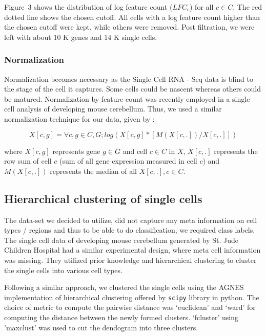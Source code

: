 Figure~3 shows the distribution of log feature count ($LFC_c$) for all $c \in C$. The red dotted line shows the chosen cutoff. All cells with a log feature count higher than the chosen cutoff were kept, while others were removed. Post filtration, we were left with about 10 K genes and 14 K single cells.

\subsubsection*{Normalization}

Normalization becomes necessary as the Single Cell RNA - Seq data is blind to the stage of the cell it captures. Some cells could be nascent whereas others could be matured. Normalization by feature count was recently employed in a single cell analysis \citep{carter2018single} of developing mouse cerebellum. Thus, we used a similar normalization technique for our data, given by :

\begin{equation}
X[c, g] = \forall c, g \in C, G; log ( X [c, g] * \left[ M (X [ c, . ] ) /  X [c, .] \right] )
\end{equation}

where $X [c, g] $ represents gene $g \in G$ and cell $c \in C$ in $X$, $X [c, .]$ represents the row sum of cell $c$ (sum of all gene expression measured in cell $c$) and $M (X [ c, . ] )$ represents the median of all $X [c, .], c \in C$.

\subsection*{Hierarchical clustering of single cells}

The data-set we decided to utilize, did not capture any meta information on cell types / regions and thus to be able to do classification, we required class labels. The single cell data of developing mouse cerebellum \citep{carter2018single} generated by St. Jude Children Hospital had a similar experimental design, where meta cell information was missing. They utilized prior knowledge and hierarchical clustering to cluster the single cells into various cell types.

Following a similar approach,  we clustered the single cells using the AGNES implementation of hierarchical clustering offered by \texttt{scipy} library in python. The choice of metric to compute the pairwise distance was `euclidean' and `ward' for computing the distance between the newly formed clusters. `fcluster' using 'maxclust' was used to cut the dendogram into three clusters.

